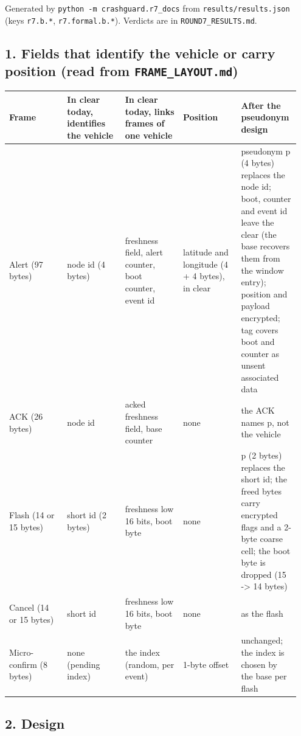 



Generated by \texttt{python -m crashguard.r7\_docs} from \texttt{results/results.json} (keys \texttt{r7.b.*}, \texttt{r7.formal.b.*}). Verdicts are in \texttt{ROUND7\_RESULTS.md}.

\subsection*{1. Fields that identify the vehicle or carry position (read from \texttt{FRAME\_LAYOUT.md})}

{\scriptsize\raggedright
\begin{longtable}{p{0.190\linewidth}p{0.190\linewidth}p{0.190\linewidth}p{0.190\linewidth}p{0.190\linewidth}}
\toprule
Frame & In clear today, identifies the vehicle & In clear today, links frames of one vehicle & Position & After the pseudonym design \\
\midrule
\endhead
Alert (97 bytes) & node id (4 bytes) & freshness field, alert counter, boot counter, event id & latitude and longitude (4 + 4 bytes), in clear & pseudonym p (4 bytes) replaces the node id; boot, counter and event id leave the clear (the base recovers them from the window entry); position and payload encrypted; tag covers boot and counter as unsent associated data \\
ACK (26 bytes) & node id & acked freshness field, base counter & none & the ACK names p, not the vehicle \\
Flash (14 or 15 bytes) & short id (2 bytes) & freshness low 16 bits, boot byte & none & p (2 bytes) replaces the short id; the freed bytes carry encrypted flags and a 2-byte coarse cell; the boot byte is dropped (15 -> 14 bytes) \\
Cancel (14 or 15 bytes) & short id & freshness low 16 bits, boot byte & none & as the flash \\
Micro-confirm (8 bytes) & none (pending index) & the index (random, per event) & 1-byte offset & unchanged; the index is chosen by the base per flash \\
\bottomrule
\end{longtable}}

\subsection*{2. Design}

